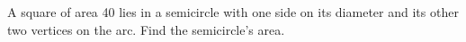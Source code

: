 A square of area 40 lies in a semicircle with one side on its diameter and its other two vertices on the arc. Find the semicircle's area.
